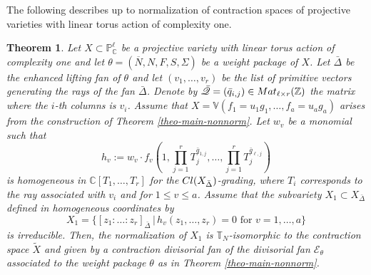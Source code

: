 \documentclass[11pt, reqno]{amsart}
\theoremstyle{plain}
\newtheorem{theorem}{Theorem}[section]
\theoremstyle{definition}
\theoremstyle{remark}
\begin{document}
The following describes up to normalization of contraction spaces of  projective
varieties with linear torus action of complexity one. 
\begin{theorem}\label{theo-main-contr-theorDelta}
Let $X\subset \mathbb{P}_{\mathbb{C}}^{\ell}$ be a projective variety with linear torus action of complexity one and let $\theta = (\overline {N}, N, F, S,\Sigma)$ be a weight package of $X$. Let $\bar{\Delta}$ be the enhanced lifting fan of $\theta$ and 
let $(v_{1}, \ldots, v_{r})$ be the list of primitive vectors 
generating the rays of the fan $\bar{\Delta}$. Denote by
$\bar{\mathscr{Q}} =  (\bar{q}_{i,j})\in {\rm Mat}_{\ell \times r}(\mathbb{Z})$ the matrix where the $i$-th columns is $v_{i}$.
 Assume that $X =  \mathbb{V}(f_{1} =  u_{1}g_{1}, \ldots, f_{a} =  u_{a}g_{a})$ arises from the construction of Theorem \ref{theo-main-nonnorm}. Let $w_{v}$ be a monomial such that 
$$h_{v} := w_{v}\cdot f_{v}\left(1,\prod_{j =  1}^{r}T_{j}^{\bar{q}_{1, j}}, \ldots, \prod_{j = 1}^{r}T_{j}^{\bar{q}_{\ell, j}}\right)$$
is homogeneous in $\mathbb{C}[T_{1}, \ldots, T_{r}]$ for the ${\rm Cl}(X_{\bar{\Delta}})$-grading, where $T_{i}$ corresponds to the ray associated with $v_{i}$ and for $1\leq v\leq a$. Assume that the subvariety $X_{1}\subset X_{\bar{\Delta}}$ defined in homogeneous coordinates by 
$$X_{1} =  \{[z_{1}: \ldots: z_{r}]_{\bar{\Delta}}\,|\, h_{v}(z_{1}, \ldots, z_{r}) =  0 \text{ for }v=1, \ldots, a\}$$
is irreducible. Then, the normalization of $X_{1}$ is $\mathbb{T}_{N}$-isomorphic to the contraction space $\widetilde{X}$ and  given
by a contraction divisorial fan of the divisorial fan $\mathscr{E}_{\theta}$ associated to the weight package $\theta$ as in Theorem \ref{theo-main-nonnorm}.
\end{theorem}
\end{document}
